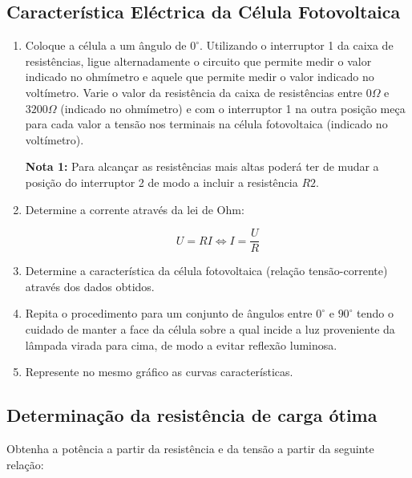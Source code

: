 \documentclass[10pt]{extarticle}
\begin{document}
\begin{multicols}{2}
\subsection{Característica Eléctrica da Célula Fotovoltaica}

\begin{enumerate}

\item  Coloque a célula a um ângulo de $0^\circ$. Utilizando o interruptor 1 da caixa de resistências, ligue alternadamente o circuito que permite medir o valor indicado no ohmímetro e aquele que permite medir o valor indicado no voltímetro. Varie o valor da resistência da caixa de resistências entre $0\Omega$ e $3200\Omega$ (indicado no ohmímetro) e com o interruptor 1 na outra posição meça para cada valor a tensão nos terminais na célula fotovoltaica (indicado no voltímetro).

\par\noindent \textbf{Nota 1:} Para alcançar as resistências mais altas poderá ter de mudar a posição do interruptor 2 de modo a incluir a resistência $R2$.

\item Determine a corrente através da lei de Ohm: 

\begin{equation}
U=RI \Leftrightarrow I=\frac{U}{R}
\end{equation}

\item Determine a característica da célula fotovoltaica (relação tensão-corrente) através dos dados obtidos.

\item Repita o procedimento para um conjunto de ângulos entre $0^\circ$ e $90^\circ$ tendo o cuidado de manter a face da célula sobre a qual incide a luz proveniente da lâmpada virada para cima, de modo a evitar reflexão luminosa.

\item Represente no mesmo gráfico as curvas características.

\end{enumerate}

\subsection{Determinação da resistência de carga ótima}

\item Obtenha a potência a partir da resistência e da tensão a partir da seguinte relação:


\end{multicols}
\end{document}
